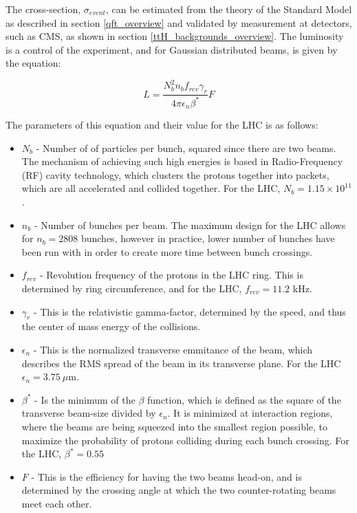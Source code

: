 \noindent  The cross-section, $\sigma_{event}$, can be estimated from the
theory of the Standard Model as described in section
\ref{qft_overview} and validated by measurement at detectors, such as
CMS, as shown in section \ref{ttH_backgrounds_overview}.  The
luminosity is a control of the experiment, and for Gaussian
distributed beams, is given by the equation:

\begin{equation}\label{eq:lumi}
L = \frac{ N_{b}^{2}n_{b}f_{rev}\gamma_{r}
}{ 4\pi\epsilon_{n}\beta^{\ast} }F
\end{equation}

\noindent The parameters of this equation and their value for the LHC
is as follows:
\begin{itemize}
\item $N_{b}$ - Number of of particles per bunch, squared since there
  are two beams.  The mechanism of achieving such high energies is
  based in Radio-Frequency (RF) cavity technology, which clusters the
  protons together into packets, which are all accelerated and
  collided together.  For the LHC, $N_{b} = 1.15 \times 10^{11}$.
\item $n_{b}$ - Number of bunches per beam.  The maximum design for
  the LHC allows for $n_{b} = 2808$ bunches, however in practice,
  lower number of bunches have been run with in order to create more
  time between bunch crossings.  
\item $f_{rev}$ - Revolution frequency of the protons in the LHC
  ring.  This is determined by ring circumference, and for the LHC,
  $f_{rev} = 11.2$ kHz. 
\item $\gamma_{r}$ - This is the relativistic gamma-factor, determined
  by the speed, and thus the center of mass energy of the collisions.  
\item $\epsilon_{n}$ - This is the normalized transverse emmitance of
  the beam, which describes the RMS spread of the beam in its
  transverse plane.  For the LHC $\epsilon_{n} = 3.75~\mu$m.  
\item $\beta^{\ast}$ - Is the minimum of the $\beta$ function, which
  is defined as the square of the transverse beam-size divided by
  $\epsilon_{n}$.  It is minimized at interaction regions, where the
  beams are being squeezed into the smallest region possible, to
  maximize the probability of protons colliding during each bunch
  crossing.  For the LHC, $\beta^{\ast} = 0.55$ 
\item $F$ - This is the efficiency for having the two beams head-on,
  and is determined by the crossing angle at which the two
  counter-rotating beams meet each other.  
\end{itemize}

